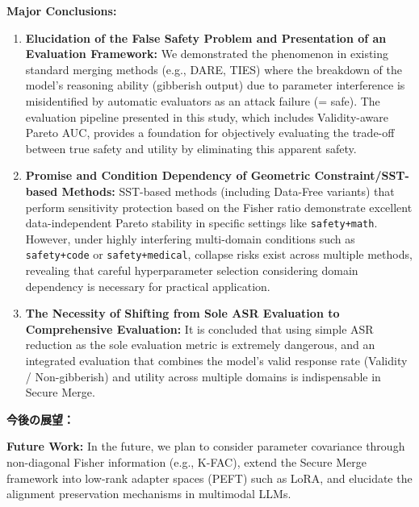 \documentclass{article}
\begin{document}
\textbf{Major Conclusions:}
\begin{enumerate}
    \item \textbf{Elucidation of the False Safety Problem and Presentation of an Evaluation Framework:} We demonstrated the phenomenon in existing standard merging methods (e.g., DARE, TIES) where the breakdown of the model's reasoning ability (gibberish output) due to parameter interference is misidentified by automatic evaluators as an attack failure (= safe). The evaluation pipeline presented in this study, which includes Validity-aware Pareto AUC, provides a foundation for objectively evaluating the trade-off between true safety and utility by eliminating this apparent safety.
    \item \textbf{Promise and Condition Dependency of Geometric Constraint/SST-based Methods:} SST-based methods (including Data-Free variants) that perform sensitivity protection based on the Fisher ratio demonstrate excellent data-independent Pareto stability in specific settings like \texttt{safety+math}. However, under highly interfering multi-domain conditions such as \texttt{safety+code} or \texttt{safety+medical}, collapse risks exist across multiple methods, revealing that careful hyperparameter selection considering domain dependency is necessary for practical application.
    \item \textbf{The Necessity of Shifting from Sole ASR Evaluation to Comprehensive Evaluation:} It is concluded that using simple ASR reduction as the sole evaluation metric is extremely dangerous, and an integrated evaluation that combines the model's valid response rate (Validity / Non-gibberish) and utility across multiple domains is indispensable in Secure Merge.
\end{enumerate}

\textbf{今後の展望：}


\textbf{Future Work:}
In the future, we plan to consider parameter covariance through non-diagonal Fisher information (e.g., K-FAC), extend the Secure Merge framework into low-rank adapter spaces (PEFT) such as LoRA, and elucidate the alignment preservation mechanisms in multimodal LLMs.
\end{document}
